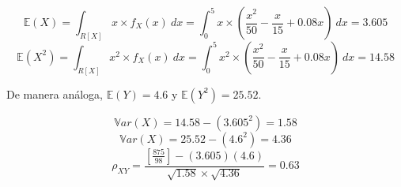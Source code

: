 \documentclass[../main.tex]{subfiles}
\begin{document}
\begin{enumerate}[(a)]
$$\mathbb{E}(X) = \int_{R[X]} x \times f_{X}(x) \ dx = \int_{0}^{5} x \times \left( \frac{x^2}{50} - \frac{x}{15} + 0.08x \right) \ dx = 3.605$$
$$\mathbb{E}(X^2) = \int_{R[X]} x^2 \times f_{X}(x) \ dx = \int_{0}^{5} x^2 \times \left( \frac{x^2}{50} - \frac{x}{15} + 0.08x \right) \ dx = 14.58$$

De manera análoga, $\mathbb{E}(Y) = 4.6$ y $\mathbb{E}(Y^2) = 25.52$.

$$\mathbb{V}ar(X) = 14.58 - (3.605^2) = 1.58$$
$$\mathbb{V}ar(X) = 25.52 - (4.6^2) = 4.36$$
$$\rho_{XY} = \frac{\left[ \frac{875}{98}  \right] - (3.605)(4.6)}{\sqrt{1.58} \times \sqrt{4.36}} = 0.63$$


\end{enumerate}
\end{document}
